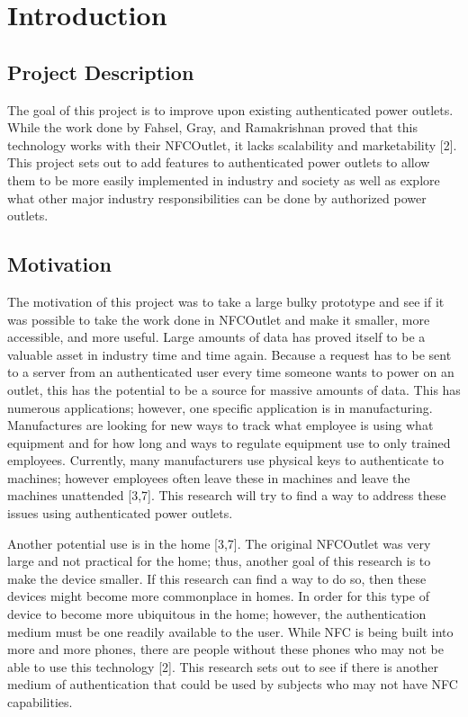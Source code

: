 \documentclass{sigchi}
\begin{document}




\section{Introduction}

\subsection {Project Description}
The goal of this project is to improve upon existing authenticated power outlets. While the work done by Fahsel, Gray, and Ramakrishnan proved that this technology works with their NFCOutlet, it lacks scalability and marketability [2]. This project sets out to add features to authenticated power outlets to allow them to be more easily implemented in industry and society as well as explore what other major industry responsibilities can be done by authorized power outlets.

\subsection {Motivation}
The motivation of this project was to take a large bulky prototype and see if it was possible to take the work done in NFCOutlet and make it smaller, more accessible, and more useful. Large amounts of data has proved itself to be a valuable asset in industry time and time again. Because a request has to be sent to a server from an authenticated user every time someone wants to power on an outlet, this has the potential to be a source for massive amounts of data. This has numerous applications; however, one specific application is in manufacturing. Manufactures are looking for new ways to track what employee is using what equipment and for how long and ways to regulate equipment use to only trained employees. Currently, many manufacturers use physical keys to authenticate to machines; however employees often leave these in machines and leave the machines unattended [3,7]. This research will try to find a way to address these issues using authenticated power outlets. 

Another potential use is in the home [3,7]. The original NFCOutlet was very large and not practical for the home; thus, another goal of this research is to make the device smaller. If this research can find a way to do so, then these devices might become more commonplace in homes. In order for this type of device to become more ubiquitous in the home; however, the authentication medium must be one readily available to the user. While NFC is being built into more and more phones, there are people without these phones who may not be able to use this technology [2]. This research sets out to see if there is another medium of authentication that could be used by subjects who may not have NFC capabilities. 
\end{document}
